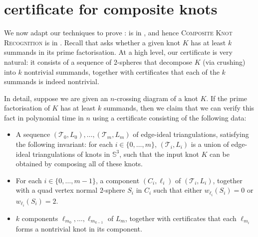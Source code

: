 \documentclass[a4paper,UKenglish,cleveref, autoref, thm-restate]{lipics-v2021}
\newcommand{\tri}{\mathcal{T}}
\begin{document}
\section{\texorpdfstring{\NP}{NP} certificate for composite knots}\label{sec:np}

We now adapt our techniques to prove :
 is in \NP, and hence \textsc{Composite Knot Recognition} is in \NP.
Recall that  asks whether a given knot $K$ has at least $k$ summands in its prime factorisation.
At a high level, our certificate is very natural:
it consists of a sequence of $2$-spheres that decompose $K$ (via crushing) into
$k$ nontrivial summands, together with certificates that each of the $k$ summands is indeed nontrivial.

In detail, suppose we are given an $n$-crossing diagram of a knot $K$.
If the prime factorisation of $K$ has at least $k$ summands, then we claim that we can
verify this fact in polynomial time in $n$ using a certificate consisting of the following data:
\begin{itemize}
\item
A sequence $(\tri_0,L_0), \ldots, (\tri_m,L_m)$ of edge-ideal triangulations, satisfying the following invariant:
for each $i\in \{0,\ldots,m\}$, $(\tri_i,L_i)$ is a union of edge-ideal triangulations of knots in $\mathbb{S}^3$,
such that the input knot $K$ can be obtained by composing all of these knots.
\item
For each $i \in \{0, \ldots, m-1\}$, a component $(C_i,\ell_i)$ of $(\tri_i,L_i)$, together with a quad vertex normal
$2$-sphere $S_i$ in $C_i$ such that either $w_{\ell_i}(S_i) = 0$ or $w_{\ell_i}(S_i) = 2$.
\item $k$ components $\ell_{m_0}, \ldots, \ell_{m_{k-1}}$ of $L_m$, together with certificates that each $\ell_{m_i}$ forms a nontrivial knot in its component.
\end{itemize}
\end{document}
